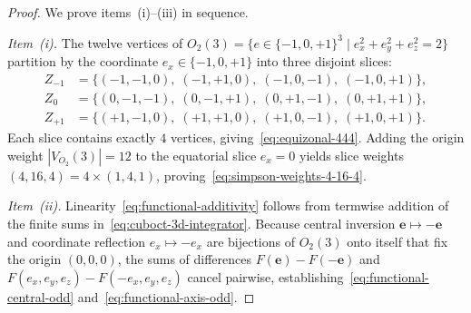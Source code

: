 \documentclass[11pt,a4paper]{article}
\theoremstyle{plain}
\theoremstyle{definition}
\begin{document}
\begin{proof}
We prove items~(i)--(iii) in sequence.

\emph{Item~(i).} The twelve vertices of $O_2(3) = \{e \in \{-1, 0, +1\}^3 \mid e_x^2 + e_y^2 + e_z^2 = 2\}$ partition by the coordinate $e_x \in \{-1, 0, +1\}$ into three disjoint slices:
\begin{align*}
  Z_{-1} &= \bigl\{(-1, -1, 0),\; (-1, +1, 0),\; (-1, 0, -1),\; (-1, 0, +1)\bigr\}, \\
  Z_{0} &= \bigl\{(0, -1, -1),\; (0, -1, +1),\; (0, +1, -1),\; (0, +1, +1)\bigr\}, \\
  Z_{+1} &= \bigl\{(+1, -1, 0),\; (+1, +1, 0),\; (+1, 0, -1),\; (+1, 0, +1)\bigr\}.
\end{align*}
Each slice contains exactly $4$ vertices, giving~\eqref{eq:equizonal-444}. Adding the origin weight $|V_{O_2}(3)| = 12$ to the equatorial slice $e_x = 0$ yields slice weights $(4, 16, 4) = 4\times(1, 4, 1)$, proving~\eqref{eq:simpson-weights-4-16-4}.

\emph{Item~(ii).} Linearity~\eqref{eq:functional-additivity} follows from termwise addition of the finite sums in~\eqref{eq:cuboct-3d-integrator}. Because central inversion $\mathbf{e} \mapsto -\mathbf{e}$ and coordinate reflection $e_x \mapsto -e_x$ are bijections of $O_2(3)$ onto itself that fix the origin $(0, 0, 0)$, the sums of differences $F(\mathbf{e}) - F(-\mathbf{e})$ and $F(e_x, e_y, e_z) - F(-e_x, e_y, e_z)$ cancel pairwise, establishing~\eqref{eq:functional-central-odd} and~\eqref{eq:functional-axis-odd}.


\end{proof}
\end{document}
